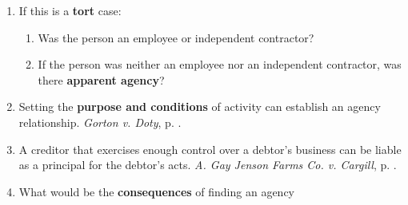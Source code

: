 \begin{enumerate}
\begin{enumerate}
\begin{enumerate}
            2.01--2.02.
            \item \textbf{Apparent}: did the third party reasonably believe 
            the agent had authority, and was that belief \emph{traceable} to 
            the principal's manifestations? \S\ 2.03.
            \item (These often overlap---e.g., \emph{Mill Street Church}, p.  
            \pageref{par:mill}.)
        \end{enumerate}
        \item Do any \textbf{exceptions} apply?\footnote{These are substitutes 
        for authority.}
        \begin{enumerate}
            \item \textbf{Ratification}: requires the principal's (1) 
            \textbf{intent to ratify} and (2) \textbf{full knowledge} of 
            material circumstances. \emph{Botticello v. Stefanovicz}, p.  
            \pageref{par:botticello}. See also Restatement (Third) \S\S\ 4.01 
            (definition), 4.02 (effect), and 4.05(1) (timing).
            \item \textbf{Estoppel}: %
            \item \textbf{Undisclosed principal}: %
        \end{enumerate}
    \end{enumerate}
    \item If this is a \textbf{tort} case:
    \begin{enumerate}
        \item Was the person an employee or independent contractor? %
        \item If the person was neither an employee nor an independent 
        contractor, was there \textbf{apparent agency}? %
    \end{enumerate}
    \item Setting the \textbf{purpose and conditions} of activity can 
    establish an agency relationship. \emph{Gorton v. Doty}, p. 
    \pageref{subsub:gorton}.
    \item A creditor that exercises enough control over a debtor's business 
    can be liable as a principal for the debtor's acts. \emph{A. Gay Jenson 
    Farms Co. v. Cargill}, p. \pageref{subsub:cargill}.
    \item What would be the \textbf{consequences} of finding an agency 

\end{enumerate}
